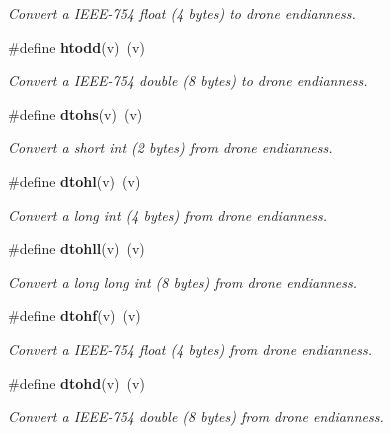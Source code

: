 \begin{DoxyCompactItemize}
\begin{DoxyCompactList}\small\item\em Convert a IEEE-\/754 float (4 bytes) to drone endianness. \item\end{DoxyCompactList}\item 
\#define {\bf htodd}(v)~(v)\label{endianness_8h_a01fe3a5f9b60e15145ab5c532851f261}

\begin{DoxyCompactList}\small\item\em Convert a IEEE-\/754 double (8 bytes) to drone endianness. \item\end{DoxyCompactList}\item 
\#define {\bf dtohs}(v)~(v)\label{endianness_8h_a39f53995baa8b852f10c5e3973581243}

\begin{DoxyCompactList}\small\item\em Convert a short int (2 bytes) from drone endianness. \item\end{DoxyCompactList}\item 
\#define {\bf dtohl}(v)~(v)\label{endianness_8h_a6e12bca84d66e29901b1a672d11053d5}

\begin{DoxyCompactList}\small\item\em Convert a long int (4 bytes) from drone endianness. \item\end{DoxyCompactList}\item 
\#define {\bf dtohll}(v)~(v)\label{endianness_8h_a76b447fd9e6707ffd8e1190715cf9c7b}

\begin{DoxyCompactList}\small\item\em Convert a long long int (8 bytes) from drone endianness. \item\end{DoxyCompactList}\item 
\#define {\bf dtohf}(v)~(v)\label{endianness_8h_aebdd3a8aee39b9451de41dc2900d4b71}

\begin{DoxyCompactList}\small\item\em Convert a IEEE-\/754 float (4 bytes) from drone endianness. \item\end{DoxyCompactList}\item 
\#define {\bf dtohd}(v)~(v)\label{endianness_8h_a4662a6ec29eab9aa3b2b7513e86b42ee}

\begin{DoxyCompactList}\small\item\em Convert a IEEE-\/754 double (8 bytes) from drone endianness. \item\end{DoxyCompactList}\end{DoxyCompactItemize}


